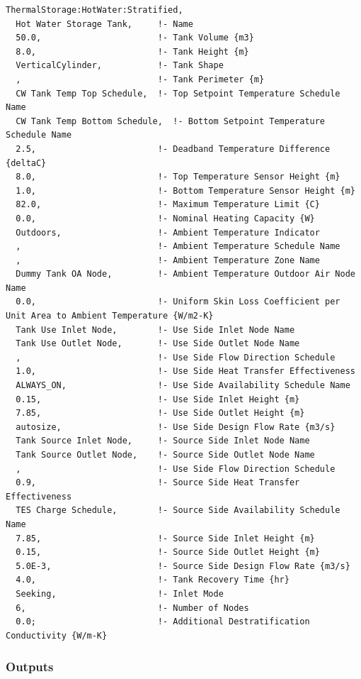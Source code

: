 \begin{lstlisting}
ThermalStorage:HotWater:Stratified,
  Hot Water Storage Tank,     !- Name
  50.0,                       !- Tank Volume {m3}
  8.0,                        !- Tank Height {m}
  VerticalCylinder,           !- Tank Shape
  ,                           !- Tank Perimeter {m}
  CW Tank Temp Top Schedule,  !- Top Setpoint Temperature Schedule Name
  CW Tank Temp Bottom Schedule,  !- Bottom Setpoint Temperature Schedule Name
  2.5,                        !- Deadband Temperature Difference {deltaC}
  8.0,                        !- Top Temperature Sensor Height {m}
  1.0,                        !- Bottom Temperature Sensor Height {m}
  82.0,                       !- Maximum Temperature Limit {C}
  0.0,                        !- Nominal Heating Capacity {W}
  Outdoors,                   !- Ambient Temperature Indicator
  ,                           !- Ambient Temperature Schedule Name
  ,                           !- Ambient Temperature Zone Name
  Dummy Tank OA Node,         !- Ambient Temperature Outdoor Air Node Name
  0.0,                        !- Uniform Skin Loss Coefficient per Unit Area to Ambient Temperature {W/m2-K}
  Tank Use Inlet Node,        !- Use Side Inlet Node Name
  Tank Use Outlet Node,       !- Use Side Outlet Node Name
  ,                           !- Use Side Flow Direction Schedule
  1.0,                        !- Use Side Heat Transfer Effectiveness
  ALWAYS_ON,                  !- Use Side Availability Schedule Name
  0.15,                       !- Use Side Inlet Height {m}
  7.85,                       !- Use Side Outlet Height {m}
  autosize,                   !- Use Side Design Flow Rate {m3/s}
  Tank Source Inlet Node,     !- Source Side Inlet Node Name
  Tank Source Outlet Node,    !- Source Side Outlet Node Name
  ,                           !- Use Side Flow Direction Schedule
  0.9,                        !- Source Side Heat Transfer Effectiveness
  TES Charge Schedule,        !- Source Side Availability Schedule Name
  7.85,                       !- Source Side Inlet Height {m}
  0.15,                       !- Source Side Outlet Height {m}
  5.0E-3,                     !- Source Side Design Flow Rate {m3/s}
  4.0,                        !- Tank Recovery Time {hr}
  Seeking,                    !- Inlet Mode
  6,                          !- Number of Nodes
  0.0;                        !- Additional Destratification Conductivity {W/m-K}
\end{lstlisting}

\subsubsection{Outputs}\label{outputs-thermalstoragehotwaterstratified}

